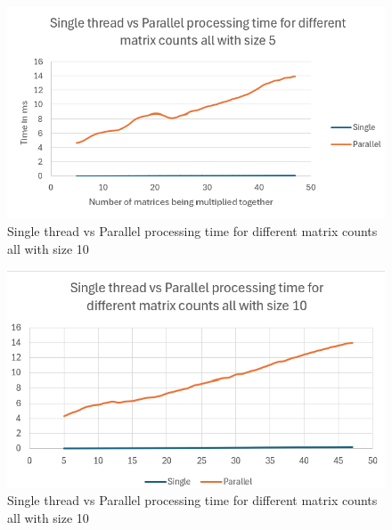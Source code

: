\begin{figure}[H]
    \centering
    \includegraphics[width=1\columnwidth]{Figures/different_matrix_counts_size 5.png}
    \caption{Single thread vs Parallel processing time for different matrix counts all with size 10}
    \label{fig:different_matrix_counts_size_10}
\end{figure}

\begin{figure}[H]
    \centering
    \includegraphics[width=1\columnwidth]{Figures/different_matrix_counts_size 10.png}
    \caption{Single thread vs Parallel processing time for different matrix counts all with size 10}
    \label{fig:different_matrix_counts_size_10}
\end{figure}

